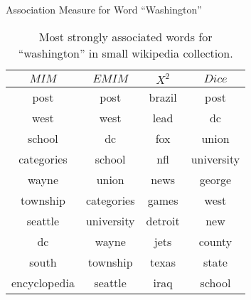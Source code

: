 \begin{table}[!htbp]
	\caption{Association Measure for Word ``Washington''} \label{tab:washington}
	\begin{center}
	\vspace{-5mm}
		\begin{tabular}{ c | c | c | c }
			\toprule
			$MIM$ & $EMIM$ & $X^2$ & $Dice$\\
			\midrule
post  &         post     &      brazil    &      post     \\
west  &         west     &      lead      &     dc          \\   
school &        dc       &      fox       &     union       \\   
categories &    school   &      nfl       &     university  \\   
wayne      &    union    &      news      &     george      \\   
township   &    categories  &   games     &     west        \\   
seattle    &    university  &   detroit   &     new         \\   
dc         &    wayne       &   jets      &     county      \\   
south      &    township    &    texas    &      state      \\    
encyclopedia  &  seattle    &    iraq     &      school    \\
			\bottomrule
		\end{tabular}
	\caption*{\scriptsize Most strongly associated words for ``washington'' in small wikipedia collection.}
	 \end{center}
\end{table}